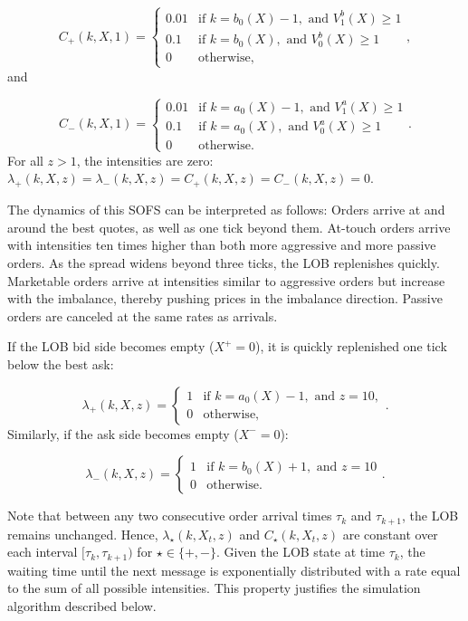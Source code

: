 \documentclass{rQUF2e}
\theoremstyle{plain}
\theoremstyle{definition}
\theoremstyle{remark}
\begin{document}
\[
    C_+(k, X, 1) =
    \begin{cases}
        0.01 & \text{if } k = b_0(X) - 1, \text{ and } V^b_1(X) \geq 1 \\
        0.1  & \text{if } k = b_0(X), \text{ and } V^b_0(X) \geq 1     \\
        0    & \text{otherwise,}
    \end{cases},
\]
and

\[
    C_-(k, X, 1) =
    \begin{cases}
        0.01 & \text{if } k = a_0(X) - 1, \text{ and } V^a_1(X) \geq 1 \\
        0.1  & \text{if } k = a_0(X), \text{ and }  V^a_0(X) \geq 1    \\
        0    & \text{otherwise.}
    \end{cases}.
\]
For all $z > 1$, the intensities are zero: $\lambda_+(k, X, z) = \lambda_-(k, X, z) = C_+(k, X, z) = C_-(k, X, z) = 0$.

The dynamics of this SOFS can be interpreted as follows: Orders arrive at and around the best quotes, as well as one tick beyond them. At-touch orders arrive with intensities ten times higher than both more aggressive and more passive orders. As the spread widens beyond three ticks, the LOB replenishes quickly. Marketable orders arrive at intensities similar to aggressive orders but increase with the imbalance, thereby pushing prices in the imbalance direction. Passive orders are canceled at the same rates as arrivals.


If the LOB bid side becomes empty ($X^+ = 0$), it is quickly replenished one tick below the best ask:

\[
    \lambda_+(k, X, z) =
    \begin{cases}
        1 & \text{if } k = a_0(X) - 1, \text{ and } z = 10, \\
        0 & \text{otherwise,}
    \end{cases}.
\]
Similarly, if the ask side becomes empty ($X^- = 0$):

\[
    \lambda_-(k, X, z) =
    \begin{cases}
        1 & \text{if } k = b_0(X) + 1, \text{ and } z = 10 \\
        0 & \text{otherwise.}
    \end{cases}.
\]

Note that between any two consecutive order arrival times $\tau_k$ and $\tau_{k+1}$, the LOB remains unchanged. Hence, $\lambda_{\star}(k, X_t, z)$ and $C_{\star}(k, X_t, z)$ are constant over each interval $[\tau_k, \tau_{k+1})$ for $\star \in \{+, -\}$. Given the LOB state at time $\tau_k$, the waiting time until the next message is exponentially distributed with a rate equal to the sum of all possible intensities. This property justifies the simulation algorithm described below.
\end{document}
